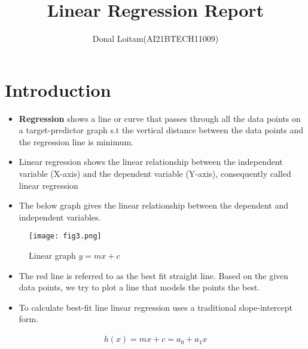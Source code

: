 \documentclass[a4paper, 11pt]{article}
\title{Linear Regression Report}
\author{Donal Loitam(AI21BTECH11009)}
\begin{document}
\maketitle
\tableofcontents

\section{Introduction}
\begin{itemize}
    \item \textbf{Regression} shows a line or curve that passes through all the data points on a target-predictor graph s.t  the vertical distance between 
    the data points and the regression line is minimum.
    \item Linear regression shows the linear relationship between the independent variable (X-axis) and the dependent variable (Y-axis), consequently called linear regression
    \item The below graph gives the linear relationship between the dependent and independent variables.
\end{itemize}
\begin{figure}[h!]
    \texttt{[image: fig3.png]}
    \caption{Linear graph $y = mx +c $}
    \label{fig:fig3}
  \end{figure}
\begin{itemize}
    \item The red line is referred to as the best fit straight line. Based on the given data points, we try to plot a line that models the points the best.
    \item To calculate best-fit line linear regression uses a traditional slope-intercept form.
\end{itemize}
\begin{align}
    h(x) = mx + c = a_0 + a_1 x
\end{align}
\pagebreak
\end{document}
